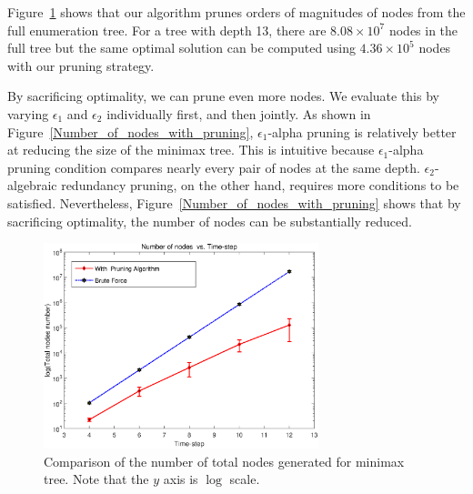 \documentclass[journal]{IEEEtran}
\begin{document}
Figure~\ref{Number_of_nodes_Time_step3} shows that our algorithm prunes orders of magnitudes of nodes from the full enumeration tree. For a tree with depth 13, there are $8.08\times 10^7$ nodes in the full tree  but the same optimal solution can be computed using $4.36\times 10^5$ nodes with our pruning strategy.


By sacrificing optimality, we can prune even more nodes. We evaluate this by varying $\epsilon_1$ and $\epsilon_2$ individually first, and then jointly. As shown in Figure~\ref{Number_of_nodes_with_pruning},  $\epsilon_1$-alpha pruning is relatively better at reducing the size of the minimax tree. This is intuitive because $\epsilon_1$-alpha pruning condition compares  nearly every pair of nodes at the same depth. $\epsilon_2$-algebraic redundancy pruning, on the other hand, requires more conditions to be satisfied. Nevertheless, Figure~\ref{Number_of_nodes_with_pruning} shows that by sacrificing optimality, the number of nodes can be substantially reduced.

\begin{figure}[!htb]
  \centering
  \includegraphics[width=8cm]{figs/Number_of_nodes_Time_step3.eps}
  \caption{Comparison of the number of total nodes generated for minimax tree. Note that the $y$ axis is $\log$ scale.}
  \label{Number_of_nodes_Time_step3}
\end{figure}
\end{document}
